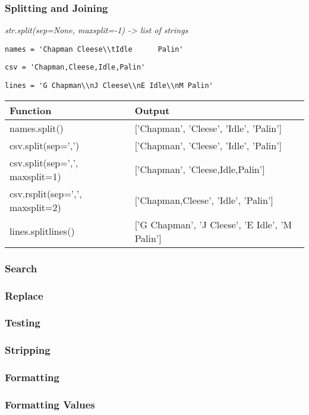 \documentclass{beamer}
\begin{document}
%
%
\begin{frame}
  \frametitle{Splitting and Joining}

  \textit{str.split(sep=None, maxsplit=-1) -> list of strings}

  \lstinline{names = 'Chapman Cleese\\tIdle      Palin'}

  \lstinline{csv = 'Chapman,Cleese,Idle,Palin'}

  \lstinline{lines = 'G Chapman\\nJ Cleese\\nE Idle\\nM Palin'}
 
  \begin{table}
    \begin{tabular}{l | l}
    Function & Output \\
    \hline
    names.split() & ['Chapman', 'Cleese', 'Idle', 'Palin'] \\
    csv.split(sep=',') & ['Chapman', 'Cleese', 'Idle', 'Palin'] \\
    csv.split(sep=',', maxsplit=1) & ['Chapman', 'Cleese,Idle,Palin'] \\
    csv.rsplit(sep=',', maxsplit=2) & ['Chapman,Cleese', 'Idle', 'Palin'] \\
    lines.splitlines() & ['G Chapman', 'J Cleese', 'E Idle', 'M Palin']
    \end{tabular}
  \end{table}
\end{frame}


%
%
\begin{frame}
  \frametitle{Search}
\end{frame}


%
%
\begin{frame}
  \frametitle{Replace}
\end{frame}


%
%
\begin{frame}
  \frametitle{Testing}
\end{frame}


%
%
\begin{frame}
  \frametitle{Stripping}
\end{frame}

\begin{frame}
  \frametitle{Formatting}
\end{frame}

%
%
\begin{frame}
  \frametitle{Formatting Values} 
\end{frame}
\end{document}
